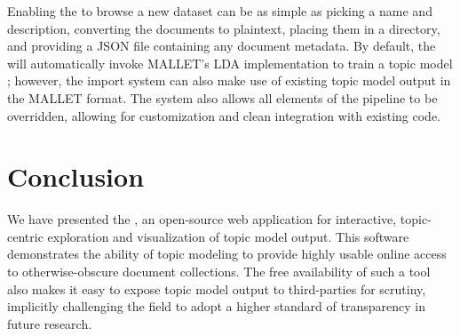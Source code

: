 \documentclass[11pt]{article}
\begin{document}
Enabling the \tool{} to browse a new dataset can be as simple as picking a name
and description, converting the documents to plaintext, placing them in a
directory, and providing a JSON file containing any document metadata. By default,
the \tool{} will automatically invoke MALLET's LDA implementation to train a
topic model \cite{McCallum2002}; however, the import system can also make use of
existing topic model output in the MALLET format. The system also allows all
elements of the pipeline to be overridden, allowing for customization and
clean integration with existing code.

\section{Conclusion}
We have presented the \tool, an open-source web application for interactive,
topic-centric exploration and visualization of topic model output.
This software demonstrates the ability of topic modeling to provide
highly usable online access to otherwise-obscure document collections.
The free availability of such a tool also makes it easy to expose
topic model output to third-parties for scrutiny, implicitly challenging
the field to adopt a higher standard of transparency in future research.



\end{document}
